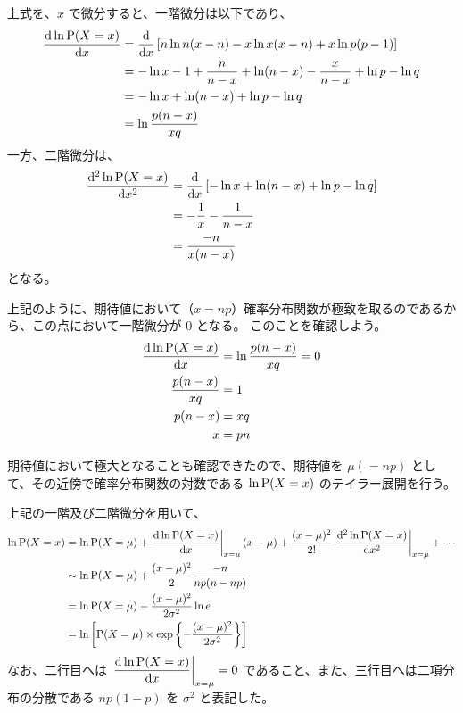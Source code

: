 \documentclass[uplatex,dvipdfmx,a4paper,11pt, titlepage]{jsarticle}
\newcommand{\diff}{\mathrm d}
\newcommand{\difd}[2]{\dfrac{\diff #1}{\diff #2}}
\newcommand{\difdd}[2]{\dfrac{\diff^2 #1}{\diff #2^2}}
\begin{document}
\begin{appendix}
上式を、$x$ で微分すると、一階微分は以下であり、
\begin{align}
\difd{\ln {\rm P}(X=x)}{x} 
	&= \difd{}{x} \left[n\ln n(x-n) - x\ln x(x-n) + x\ln p(p-1) \right] \notag \\
	&= - \ln {x} -1 + \dfrac{n}{n - x} + \ln(n-x) -\dfrac{x}{n-x} + \ln{p} - \ln{q} \notag \\
	&= - \ln {x} + \ln(n-x) + \ln{p} - \ln{q} \notag \\
	&= \ln \dfrac{p(n-x)}{xq}
\end{align}
一方、二階微分は、
\begin{align}
\difdd{\ln {\rm P}(X=x)}{x} 
	&= \difd{}{x} \left[- \ln {x} + \ln(n-x) + \ln{p} - \ln{q} \right] \notag \\
	&= -\dfrac{1}{x} -\dfrac{1}{n-x} \notag \\
	&= \dfrac{-n}{x(n-x)}
\end{align}
となる。

上記のように、期待値において（$x=np$）確率分布関数が極致を取るのであるから、この点において一階微分が $0$ となる。
このことを確認しよう。
\begin{align}
\difd{\ln {\rm P}(X=x)}{x} &= \ln \dfrac{p(n-x)}{xq} = 0 \notag \\
\dfrac{p(n-x)}{xq} &= 1 \notag \\
p(n-x) &= xq \notag \\
x &= pn
\end{align}

期待値において極大となることも確認できたので、期待値を $\mu (= np)$ として、その近傍で確率分布関数の対数である $\ln {\rm P}(X=x)$ のテイラー展開を行う。

上記の一階及び二階微分を用いて、
\begin{align}
\ln {\rm P}(X=x) 
	&= \ln {\rm P}(X=\mu) + \left. \difd{\ln {\rm P}(X=x)}{x} \right|_{x=\mu} (x-\mu) + \dfrac{(x-\mu)^2}{2!} \left. \difdd{\ln {\rm P}(X=x)}{x} \right|_{x=\mu} +\cdots \notag \\
	&\sim \ln {\rm P}(X=\mu) + \dfrac{(x-\mu)^2}{2} \dfrac{-n}{np(n-np)} \notag \\
	&= \ln {\rm P}(X=\mu) - \dfrac{(x-\mu)^2}{2 \sigma^2} \ln e \notag \\
	&= \ln \left[{\rm P}(X=\mu) \times \exp \left\{ -\dfrac{(x-\mu)^2}{2 \sigma^2} \right\} \right]
\end{align}
なお、二行目へは $\left. \difd{\ln {\rm P}(X=x)}{x} \right|_{x=\mu} =0$ であること、また、三行目へは二項分布の分散である $np(1-p)$ を $\sigma^2$ と表記した。


\end{appendix}
\end{document}
